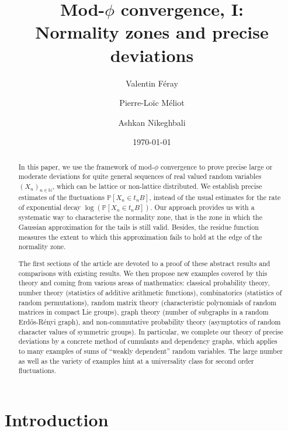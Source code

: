 \documentclass[12pt,a4paper,reqno]{amsart}
\title[Mod-$\phi$ convergence, I]{Mod-$\phi$ convergence, I: \\ 
Normality zones and precise deviations}
\author{Valentin F\'eray}
\author{Pierre-Lo\"ic M\'eliot}
\author{Ashkan Nikeghbali}
\date{\today}
\theoremstyle{remark}
\newcommand{\N}{\mathbb{N}}
\newcommand{\proba}{\mathbb{P}}
\begin{document}
\begin{abstract}
In this paper, we use the framework of mod-$\phi$ convergence to prove precise large or moderate deviations for quite general sequences of real valued random variables $(X_{n})_{n \in \N}$, which can be lattice or non-lattice distributed. We establish precise estimates of the fluctuations $\proba[X_{n} \in t_{n}B]$, instead of the usual estimates for the rate of exponential decay  $\log( \proba[X_{n}\in t_{n}B])$. Our approach provides us with a systematic way to characterise the normality zone, that is the zone in which the Gaussian approximation for the tails is still valid. Besides, the residue function measures the extent to which this approximation fails to hold at the edge of the normality zone.\medskip

The first sections of the article are devoted to a proof of these abstract results and comparisons with existing results. We then propose new examples covered by this theory and coming from various areas of mathematics: classical probability  theory, number theory (statistics of additive arithmetic functions), combinatorics (statistics of random permutations), random matrix theory (characteristic polynomials of random matrices in compact Lie groups), graph theory (number of subgraphs in a random Erd\H{o}s-R\'enyi graph), and non-commutative probability theory (asymptotics of random character values of symmetric groups). In particular, we complete our theory of precise deviations by a concrete method of cumulants and dependency graphs, which applies to many examples of sums of ``weakly dependent'' random variables. The large number as well as the variety of examples hint at a universality class for second order fluctuations. 
\end{abstract}

\maketitle

\clearpage

\tableofcontents


\clearpage













\section{Introduction}
\end{document}
